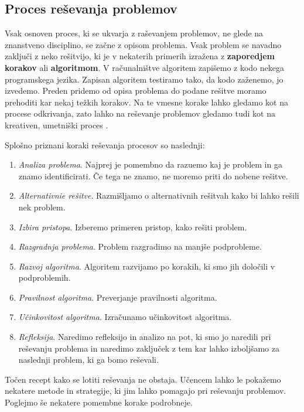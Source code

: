 \subsection{Proces reševanja problemov}
\label{sec:proces_reševanja_problemov}

Vsak osnoven proces, ki se ukvarja z raševanjem problemov, ne glede na
znanstveno disciplino, se začne z opisom problema. Vsak problem se
navadno zaključi z neko rešitvijo, ki je v nekaterih primerih izražena
z \textbf{zaporedjem korakov} ali \textbf{algoritmom}. V računalništve
algoritem zapišemo z kodo nekega programskega jezika. Zapisan
algoritem testiramo tako, da kodo zaženemo, jo izvedemo. Preden
pridemo od opisa problema do podane rešitve moramo prehoditi kar nekaj
težkih korakov. Na te vmesne korake lahko gledamo kot na procese
odkrivanja, zato lahko na reševanje problemov gledamo tudi kot na
kreativen, umetniški proces \cite{guideTCS}.

Splošno priznani koraki reševanja procesov so naslednji:

\begin{enumerate}
\item \emph{Analiza problema}. Najprej je pomembno da razuemo kaj je
  problem in ga znamo identificirati. Če tega ne znamo, ne moremo
  priti do nobene rešitve.
\item \emph{Alternativnie rešitve}. Razmišljamo o alternativnih
  rešitvah kako bi lahko rešili nek problem.
\item \emph{Izbira pristopa}. Izberemo primeren pristop, kako rešiti problem.
\item \emph{Razgradnja problema}. Problem razgradimo na manjše podprobleme.
\item \emph{Razvoj algoritma}. Algoritem razvijamo po korakih, ki smo
  jih določili v podproblemih.
\item \emph{Pravilnost algoritma}. Preverjanje pravilnosti algoritma.
\item \emph{Učinkovitost algoritma}. Izračunamo učinkovitost algoritma.
\item \emph{Refleksija}. Naredimo refleksijo in analizo na pot, ki smo
  jo naredili pri reševanju problema in naredimo zaključek z tem kar
  lahko izboljšamo za naslednji problem, ki ga bomo reševali.
\end{enumerate}

Točen recept kako se lotiti reševanja ne obstaja. Učencem lahko le
pokažemo nekatere metode in strategije, ki jim lahko pomagajo pri
reševanju problemov. Poglejmo še nekatere pomembne korake podrobneje.

